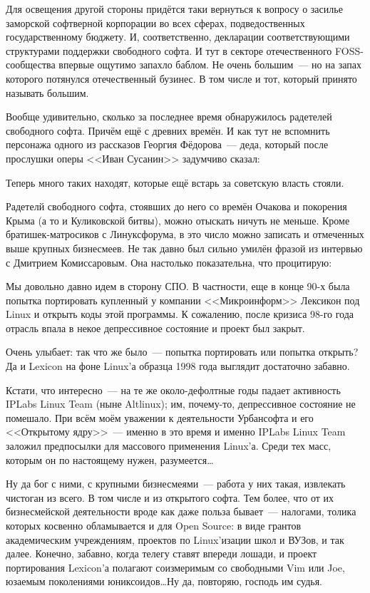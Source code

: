 Для освещения другой стороны придётся таки вернуться к вопросу о засилье заморской софтверной корпорации во всех сферах, подведоственных государственному бюджету. И, соответственно, декларации соответствующими структурами поддержки свободного софта. И тут в секторе отечественного FOSS-сообщества впервые ощутимо запахло баблом. Не очень большим~--- но на запах которого потянулся отечественный бузинес. В том числе и тот, который принято называть большим.

Вообще удивительно, сколько за последнее время обнаружилось радетелей свободного софта. Причём ещё с древних времён. И как тут не вспомнить персонажа одного из рассказов Георгия Фёдорова~--- деда, который после прослушки оперы <<Иван Сусанин>> задумчиво сказал:


\begin{shadequote}{}
Теперь много таких находят, которые ещё встарь за советскую власть стояли.
\end{shadequote}

Радетелй свободного софта, стоявших до него со времён Очакова и покорения Крыма (а то и Куликовской битвы), можно отыскать ничуть не меньше. Кроме братишек-матросиков с Линуксфорума, в это число можно записать и отмеченных выше крупных бизнесмеев. Не так давно был сильно умилён фразой из интервью с Дмитрием Комиссаровым. Она настолько показательна, что процитирую:


\begin{shadequote}{}
Мы довольно давно идем в сторону СПО. В частности, еще в конце 90-х была попытка портировать купленный у компании <<Микроинформ>> Лексикон под Linux и открыть коды этой программы. К сожалению, после кризиса 98-го года отрасль впала в некое депрессивное состояние и проект был закрыт.
\end{shadequote}

Очень улыбает: так что же было~--- попытка портировать или попытка открыть? Да и Lexicon на фоне Linux'а образца 1998 года выглядит достаточно забавно.

Кстати, что интересно~--- на те же около-дефолтные годы падает активность IPLabs Linux Team (ныне Altlinux); им, почему-то, депрессивное состояние не помешало. При всём моём уважении к деятельности Урбансофта и его <<Открытому ядру>>~--- именно в это время и именно IPLabs Linux Team заложил предпосылки для массового применения Linux'а. Среди тех масс, которым он по настоящему нужен, разумеется\dots

Ну да бог с ними, с крупными бизнесмеями~--- работа у них такая, извлекать чистоган из всего. В том числе и из открытого софта. Тем более, что от их бизнесмейской деятельности вроде как даже польза бывает~--- налогами, толика которых косвенно обламывается и для Open Source: в виде грантов академическим учреждениям, проектов по Linux'изации школ и ВУЗов, и так далее. Конечно, забавно, когда телегу ставят впереди лошади, и проект портирования Lexicon'а полагают соизмеримым со свободными Vim или Joe, юзаемым поколениями юниксоидов\dots Ну да, повторяю, господь им судья.

